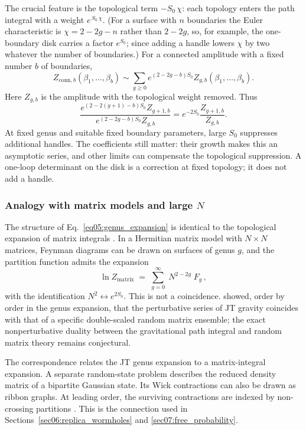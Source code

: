 \documentclass[11pt,letterpaper]{article}
\theoremstyle{plain}
\theoremstyle{definition}
\theoremstyle{remark}
\begin{document}
The crucial feature is the topological term $-S_0\,\chi$: each topology enters
the path integral with a weight $e^{\,S_0\,\chi}$.  (For a surface with $n$
boundaries the Euler characteristic is $\chi = 2-2g-n$ rather than $2-2g$, so,
for example, the one-boundary disk carries a factor $e^{S_0}$; since adding a
handle lowers $\chi$ by two whatever the number of boundaries.) For a
connected amplitude with a fixed number $b$ of boundaries,
\begin{equation}\label{eq05:genus_expansion}
 Z_{\mathrm{conn},b}(\beta_1,\ldots,\beta_b)
 \sim \sum_{g\geq0} e^{(2-2g-b)S_0}
 Z_{g,b}(\beta_1,\ldots,\beta_b).
\end{equation}
Here $Z_{g,b}$ is the amplitude with the topological weight removed. Thus
\begin{equation}\label{eq05:genus_suppression}
 \frac{e^{(2-2(g+1)-b)S_0}Z_{g+1,b}}
      {e^{(2-2g-b)S_0}Z_{g,b}}
 =e^{-2S_0}\frac{Z_{g+1,b}}{Z_{g,b}}.
\end{equation}
At fixed genus and suitable fixed boundary parameters, large $S_0$
suppresses additional handles. The coefficients still matter: their
growth makes this an asymptotic series, and other limits can compensate
the topological suppression. A one-loop determinant on the disk is a
correction at fixed topology; it does not add a handle.

\subsubsection*{Analogy with matrix models and large $N$}

The structure of Eq.~\eqref{eq05:genus_expansion} is identical to the
topological expansion of matrix integrals \citep{thooft1974}.  In a Hermitian
matrix model with $N \times N$ matrices, Feynman diagrams can be drawn on
surfaces of genus $g$, and the partition function admits the expansion
\begin{equation}\label{eq05:matrix_genus}
  \ln Z_{\text{matrix}} \;=\; \sum_{g=0}^{\infty}\; N^{2-2g}\; F_g\,,
\end{equation}
with the identification $N^2 \leftrightarrow e^{2S_0}$.  This is not a
coincidence.  \citet{saadetal2019} showed, order by order in the genus
expansion, that the perturbative series of JT gravity coincides with that of a
specific double-scaled random matrix ensemble; the exact nonperturbative
duality between the gravitational path integral and random matrix theory
remains conjectural.

The correspondence relates the JT genus expansion to a matrix-integral
expansion. A separate random-state problem describes the reduced density
matrix of a bipartite Gaussian state. Its Wick contractions can also be
drawn as ribbon graphs. At leading order, the surviving contractions are
indexed by non-crossing partitions \citep{speicher1994}. This is the
connection used in Sections~\ref{sec06:replica_wormholes} and
\ref{sec07:free_probability}.
\end{document}
